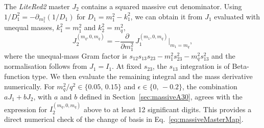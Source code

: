 The \textit{LiteRed2} master $J_2$ contains a squared massive cut denominator. Using
$1/D_1^2 = -\partial_{m_1^2}(1/D_1)$ for $D_1=m_1^2-k_1^2$, we can obtain it from $J_1$
evaluated with unequal masses, $k_1^2=m_1^2$ and $k_2^2=m_q^2$,
\begin{equation}
    J_2^{(m_q,0,m_q)} = -\frac{\partial}{\partial m_1^2}\,J_1^{(m_1,0,m_q)}\Big|_{m_1=m_q},
\end{equation}
where the unequal-mass Gram factor is $s_{12}s_{13}s_{23}-m_1^2s_{23}^2-m_q^2s_{13}^2$ and the
normalisation follows from $J_1=I_1$. At fixed $s_{23}$, the $s_{13}$ integration is of
Beta-function type. We then evaluate the remaining integral and the mass derivative numerically.
For $m_q^2/q^2\in\{0.05,\,0.15\}$ and $\epsilon\in\{0,\,-0.2\}$, the combination $aJ_1+bJ_2$,
with $a$ and $b$ defined in Section~\ref{sec:massiveA30}, agrees with the expression for
$I_2^{(m_q,0,m_q)}$ above to at least 12 significant digits. This provides a direct numerical
check of the change of basis in Eq.~\eqref{eq:massiveMasterMap}.
